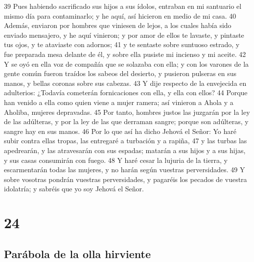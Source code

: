 39 Pues habiendo sacrificado sus hijos a sus ídolos, entraban en mi santuario el mismo día para contaminarlo; y he aquí, así hicieron en medio de mi casa.
40 Además, enviaron por hombres que viniesen de lejos, a los cuales había sido enviado mensajero, y he aquí vinieron; y por amor de ellos te lavaste, y pintaste tus ojos, y te ataviaste con adornos;
41 y te sentaste sobre suntuoso estrado, y fue preparada mesa delante de él, y sobre ella pusiste mi incienso y mi aceite.
42 Y se oyó en ella voz de compañía que se solazaba con ella; y con los varones de la gente común fueron traídos los sabeos del desierto, y pusieron pulseras en sus manos, y bellas coronas sobre sus cabezas.
43 Y dije respecto de la envejecida en adulterios: ¿Todavía cometerán fornicaciones con ella, y ella con ellos?
44 Porque han venido a ella como quien viene a mujer ramera; así vinieron a Ahola y a Aholiba, mujeres depravadas.
45 Por tanto, hombres justos las juzgarán por la ley de las adúlteras, y por la ley de las que derraman sangre; porque son adúlteras, y sangre hay en sus manos.
46 Por lo que así ha dicho Jehová el Señor: Yo haré subir contra ellas tropas, las entregaré a turbación y a rapiña,
47 y las turbas las apedrearán, y las atravesarán con sus espadas; matarán a sus hijos y a sus hijas, y sus casas consumirán con fuego.
48 Y haré cesar la lujuria de la tierra, y escarmentarán todas las mujeres, y no harán según vuestras perversidades.
49 Y sobre vosotras pondrán vuestras perversidades, y pagaréis los pecados de vuestra idolatría; y sabréis que yo soy Jehová el Señor.

\chapter{24}

\section*{Parábola de la olla hirviente}

